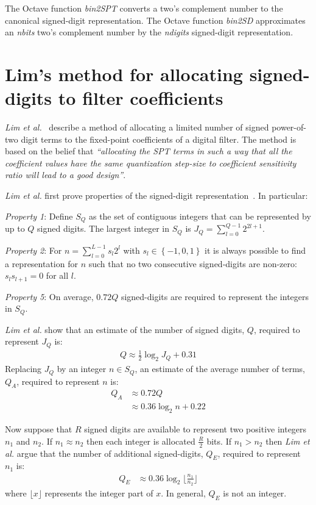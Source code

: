 \documentclass[a4paper,twoside,10pt,english]{report}
\begin{document}
The Octave function \emph{bin2SPT} converts a two's complement number to the
canonical signed-digit representation. The Octave function \emph{bin2SD} 
approximates an \emph{nbits} two's complement number by the \emph{ndigits}
signed-digit representation.

\section{\label{sec:Lim-allocation-signed-digits}Lim's method for allocating signed-digits to filter coefficients}
\emph{Lim et al.}~\cite{Lim_SignedPowerOfTwoAllocationDigitalFilters} describe
a method of allocating  a limited number of signed power-of-two digit terms 
to the fixed-point coefficients of a digital filter. The method is based 
on the belief that \emph{``allocating the SPT terms in such a way that all the 
coefficient values have the same quantization step-size to coefficient
sensitivity ratio will lead to a good design''}. 

\emph{Lim et al.} first prove properties of the signed-digit
representation~\cite[Section II]{Lim_SignedPowerOfTwoAllocationDigitalFilters}.
In particular:

\emph{Property 1}: Define $S_{Q}$ as the set of contiguous integers that can be 
represented by up to $Q$ signed digits. The largest integer in $S_{Q}$ is
$J_{Q}=\sum_{l=0}^{Q-1}2^{2l+1}$.

\emph{Property 2}: For $n=\sum^{L-1}_{l=0}s_{l}2^{l}$ with 
$s_{l}\in\left\{-1,0,1\right\}$ it is always possible to 
find a representation for $n$ such that no two consecutive signed-digits are 
non-zero: $s_{l}s_{l+1}=0$ for all $l$.

\emph{Property 5}: On average, $0.72Q$ signed-digits are required to represent
the integers in $S_{Q}$.

\emph{Lim et al.} show that an estimate of the number of signed digits, $Q$, 
required to represent $J_{Q}$ is:
\begin{align*}
  Q \approx \frac{1}{2}\log_{2}J_{Q}+0.31
\end{align*}
Replacing $J_{Q}$ by an integer $n\in S_{Q}$, an estimate of the average number
of terms, $Q_{A}$, required to represent $n$ is:
\begin{align*}
  Q_{A}&\approx 0.72Q\\
      &\approx 0.36 \log_{2}n+0.22
\end{align*}

Now suppose that $R$ signed digits are available to represent two positive
integers $n_{1}$ and $n_{2}$. If $n_{1}\approx n_{2}$ then each integer is
allocated $\frac{R}{2}$ bits. If $n_{1}>n_{2}$ then \emph{Lim et al.} argue 
that the number of additional signed-digits, $Q_{E}$, required to represent 
$n_{1}$ is:
\begin{align*}
  Q_{E}&\approx 0.36\log_{2}\lfloor \frac{n_{1}}{n_{2}}\rfloor
\end{align*}
where $\lfloor x \rfloor$ represents the integer part of $x$. In general, 
$Q_{E}$ is not an integer.
\end{document}
